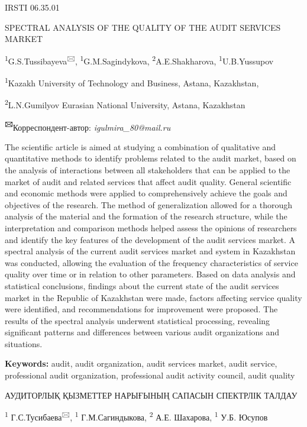 IRSTI 06.35.01

SPECTRAL ANALYSIS OF THE QUALITY OF THE AUDIT SERVICES MARKET

\textsuperscript{1}G.S.Tussibayeva\textsuperscript{🖂},
\textsuperscript{1}G.M.Sagindykova, \textsuperscript{2}A.E.Shakharova,
\textsuperscript{1}U.B.Yussupov

\textsuperscript{1}Kazakh University of Technology and Business, Astana,
Kazakhstan,

\textsuperscript{2}L.N.Gumilyov Eurasian National University, Astana,
Kazakhstan

\textbf{\textsuperscript{🖂}}Корреспондент-автор:
\emph{igulmira\_80@mail.ru}

The scientific article is aimed at studying a combination of qualitative
and quantitative methods to identify problems related to the audit
market, based on the analysis of interactions between all stakeholders
that can be applied to the market of audit and related services that
affect audit quality. General scientific and economic methods were
applied to comprehensively achieve the goals and objectives of the
research. The method of generalization allowed for a thorough analysis
of the material and the formation of the research structure, while the
interpretation and comparison methods helped assess the opinions of
researchers and identify the key features of the development of the
audit services market. A spectral analysis of the current audit services
market and system in Kazakhstan was conducted, allowing the evaluation
of the frequency characteristics of service quality over time or in
relation to other parameters. Based on data analysis and statistical
conclusions, findings about the current state of the audit services
market in the Republic of Kazakhstan were made, factors affecting
service quality were identified, and recommendations for improvement
were proposed. The results of the spectral analysis underwent
statistical processing, revealing significant patterns and differences
between various audit organizations and situations.

\textbf{Keywords:} audit, audit organization, audit services market,
audit service, professional audit organization, professional audit
activity council, audit quality

АУДИТОРЛЫҚ ҚЫЗМЕТТЕР НАРЫҒЫНЫҢ САПАСЫН СПЕКТРЛІК ТАЛДАУ

\textsuperscript{1} Г.С.Тусибаева\textsuperscript{🖂},
\textsuperscript{1} Г.М.Сагиндыкова, \textsuperscript{2} А.Е. Шахарова,
\textsuperscript{1} У.Б. Юсупов

